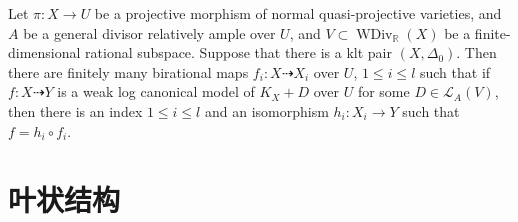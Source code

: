 \begin{theorem}\label{finitewlcm}

	Let $\pi: X\to U$ be a projective morphism of normal quasi-projective varieties, and $A$ be a general divisor relatively ample over $U$, and $V \subset \operatorname{WDiv}_{\mathbb{R}}(X)$ be a finite-dimensional rational subspace. Suppose that there is a klt pair $(X,\Delta_{0})$. Then there are finitely many birational maps $f_{i}:X \dashrightarrow X_{i}$ over $U$, $1\leqslant i\leqslant l$ such that if $f:X \dashrightarrow  Y$ is a weak log canonical model of $K_{X}+D$ over $U$ for some $D \in \mathcal{L}_{A}(V)$, then there is an index $1\leqslant i\leqslant l$ and an  isomorphism  $h_{i}:X_{i} \to Y$  such that $f=h_{i}\circ f_{i}$.

\end{theorem}
\section{叶状结构}

